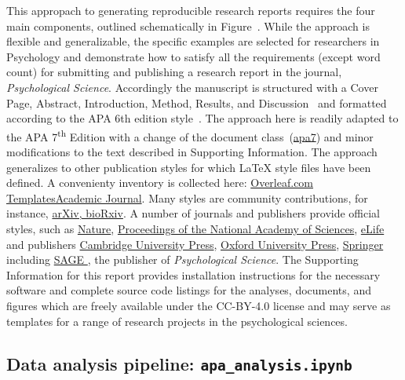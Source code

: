 \documentclass[helv,10pt,man,floatsintext]{apa6}  %
\begin{document}
This appropach to generating reproducible research reports requires
the four main components, outlined schematically in
Figure~. While the approach is flexible and
generalizable, the specific examples are selected for researchers in
Psychology and demonstrate how to satisfy all the requirements (except
word count) for submitting and publishing a research report in the
journal, {\it Psychological Science}. Accordingly the manuscript is
structured with a Cover Page, Abstract, Introduction, Method, Results,
and Discussion~\parencite{APSStructStyle} and formatted according to
the APA 6th edition style~\parencite{APAStyle6th}. The approach here
is readily adapted to the APA 7\textsuperscript{th} Edition with a
change of the document
class~({\href{https://www.overleaf.com/project/5f3053af0af0dc00016f191b}{apa7}})
and minor modifications to the text described in Supporting
Information. The approach generalizes to other publication styles for
which \LaTeX{} style files have been defined.  A convenienty inventory
is collected here:
\href{https://www.overleaf.com/latex/templates/tagged/academic-journal}{Overleaf.com
  Templates\textemdash Academic Journal}. Many styles are community
contributions, for instance,
\href{https://www.overleaf.com/latex/templates/tagged/arxiv}{arXiv,
  bioRxiv}.
%
A number of journals and publishers provide official styles, such as
%
\href{https://www.overleaf.com/latex/templates/tagged/npg}{Nature},
\href{https://www.overleaf.com/latex/templates/tagged/pnas}{Proceedings of the National Academy of Sciences},
\href{https://www.overleaf.com/latex/templates/tagged/elife-official}{eLife}
%
and publishers
%
\href{https://www.overleaf.com/latex/templates/tagged/cup-official}{Cambridge University Press},
\href{https://www.overleaf.com/latex/templates/oup-general-template/fqkhysbcbpwv}{Oxford University Press},
\href{https://www.overleaf.com/latex/templates/tagged/springer}{Springer}
%
including 
%
\href{
  https://www.overleaf.com/latex/templates/a-demonstration-of-the-latex2e-class-file-for-sage-publications/jcdyknyjrkzb
}{
  SAGE
},
%
the publisher of {\em Psychological Science}.
%
The Supporting Information for this report provides installation
instructions for the necessary software and complete source code
listings for the analyses, documents, and figures which are freely
available under the CC-BY-4.0 license and may serve as templates for
a range of research projects in the psychological sciences.


\subsection{Data analysis pipeline: \texttt{apa_analysis.ipynb}}
\end{document}
